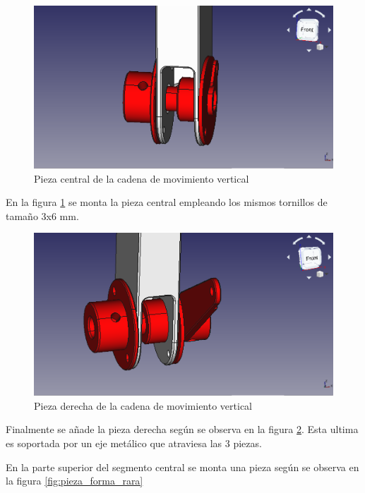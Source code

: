 \begin{figure}[H]
    \centering 
    \includegraphics[width=1\linewidth]{pictures/SoporteMotorCentral.png}
    \caption{Pieza central de la cadena de movimiento vertical}
    \label{fig:pieza_central_brazo}
\end{figure}

En la figura \ref{fig:pieza_central_brazo} se monta la pieza central empleando los mismos tornillos de tamaño 3x6 mm.

\begin{figure}[H]
    \centering 
    \includegraphics[width=1\linewidth]{pictures/SoporteMotorDerecho.png}
    \caption{Pieza derecha de la cadena de movimiento vertical}
    \label{fig:pieza_derecha_brazo}
\end{figure}

Finalmente se añade la pieza derecha según se observa en la figura \ref{fig:pieza_derecha_brazo}. Esta ultima es soportada por un eje metálico que atraviesa las 3 piezas.

En la parte superior del segmento central se monta una pieza según se observa en la figura \ref{fig:pieza_forma_rara}

